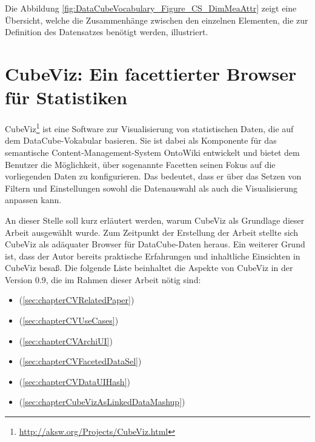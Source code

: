 \documentclass[11pt]{article}
\begin{document}
Die Abbildung \ref{fig:DataCubeVocabulary_Figure_CS_DimMeaAttr} zeigt eine Übersicht, welche die Zusammenhänge zwischen den einzelnen Elementen, die zur Definition des Datensatzes benötigt werden, illustriert.


%
%
%
\newpage
\section{CubeViz: Ein facettierter Browser für Statistiken}
\label{sec:chapterCubeViz}

CubeViz\footnote{\url{http://aksw.org/Projects/CubeViz.html}} ist eine Software zur Visualisierung von statistischen Daten, die auf dem DataCube-Vokabular basieren. Sie ist dabei als Komponente für das semantische Content-Management-System OntoWiki entwickelt und bietet dem Benutzer die Möglichkeit, über sogenannte Facetten seinen Fokus auf die vorliegenden Daten zu konfigurieren. Das bedeutet, dass er über das Setzen von Filtern und Einstellungen sowohl die Datenauswahl als auch die Visualisierung anpassen kann. \cite[S. 6]{CUBEVIZ-VISZSTATS} \cite[S. 5-6]{CUBEVIZ-PUBSTATIS}

An dieser Stelle soll kurz erläutert werden, warum CubeViz als Grundlage dieser Arbeit ausgewählt wurde. Zum Zeitpunkt der Erstellung der Arbeit stellte sich CubeViz als adäquater Browser für DataCube-Daten heraus. Ein weiterer Grund ist, dass der Autor bereits praktische Erfahrungen und inhaltliche Einsichten in CubeViz besaß. Die folgende Liste beinhaltet die Aspekte von CubeViz in der Version 0.9, die im Rahmen dieser Arbeit nötig sind:

\begin{itemize}
\setlength{\itemsep}{0mm}
    \item {} (\ref{sec:chapterCVRelatedPaper})
    \item {} (\ref{sec:chapterCVUseCases})
    \item {} (\ref{sec:chapterCVArchiUI})
    \item {} (\ref{sec:chapterCVFacetedDataSel})
    \item {} (\ref{sec:chapterCVDataUIHash})
    \item {} (\ref{sec:chapterCubeVizAsLinkedDataMashup})
\end{itemize}
\end{document}
